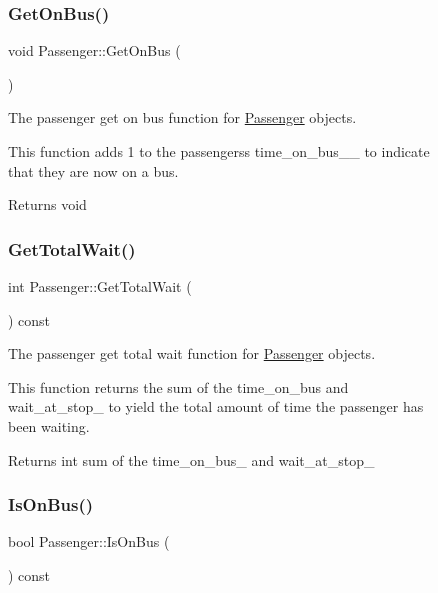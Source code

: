 \begin{figure}[H]
\begin{center}
\subsubsection{\texorpdfstring{Get\+On\+Bus()}{GetOnBus()}}
{\footnotesize\ttfamily void Passenger\+::\+Get\+On\+Bus (\begin{DoxyParamCaption}{ }\end{DoxyParamCaption})}



The passenger get on bus function for \hyperlink{classPassenger}{Passenger} objects. 

This function adds 1 to the passengers\textquotesingle{}s time\+\_\+on\+\_\+bus\+\_\+\+\_\+ to indicate that they are now on a bus.

\begin{DoxyReturn}{Returns}
void 
\end{DoxyReturn}
\mbox{\label{classPassenger_a25158560f790ef7ef06d94c414b34f25}} 
\subsubsection{\texorpdfstring{Get\+Total\+Wait()}{GetTotalWait()}}
{\footnotesize\ttfamily int Passenger\+::\+Get\+Total\+Wait (\begin{DoxyParamCaption}{ }\end{DoxyParamCaption}) const}



The passenger get total wait function for \hyperlink{classPassenger}{Passenger} objects. 

This function returns the sum of the time\+\_\+on\+\_\+bus and wait\+\_\+at\+\_\+stop\+\_\+ to yield the total amount of time the passenger has been waiting.

\begin{DoxyReturn}{Returns}
int sum of the time\+\_\+on\+\_\+bus\+\_\+ and wait\+\_\+at\+\_\+stop\+\_\+ 
\end{DoxyReturn}
\mbox{\label{classPassenger_a2acf008ec444afcc859b914ee24add0e}} 
\subsubsection{\texorpdfstring{Is\+On\+Bus()}{IsOnBus()}}
{\footnotesize\ttfamily bool Passenger\+::\+Is\+On\+Bus (\begin{DoxyParamCaption}{ }\end{DoxyParamCaption}) const}




\end{center}
\end{figure}
